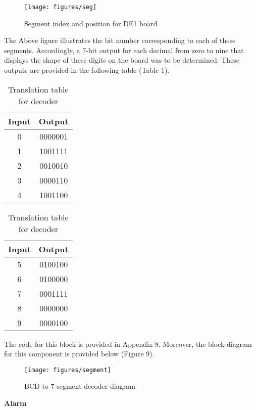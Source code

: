 \documentclass[12pt,a4paper]{article}
\begin{document}
		\vspace{-0.5cm} 
	\begin{figure}[H]
		\centering
		\texttt{[image: figures/seg]}
		\caption{Segment index and position for DE1 board}
	\end{figure}
\vspace{-0.2cm}
	\noindent The Above figure illustrates the bit number corresponding to each of these segments. Accordingly, a 7-bit output for each decimal from zero to nine that displays the shape of these digits on the board was to be determined. These outputs are provided in the following table (Table 1).
	\begin{table}[H]
		\centering
		\begin{tabular}{|c | c| }
			\hline
			\textbf{Input} & \textbf{Output} \\ \hline
			0& 0000001\\\hline
			1&1001111\\\hline
			2&0010010\\\hline
			3&0000110\\\hline
			4&1001100\\\hline
		\end{tabular}
	\hspace{0.2cm}
	\begin{tabular}{|c | c| }
		\hline
		\textbf{Input} & \textbf{Output} \\ \hline
		5&0100100\\\hline
		6&0100000\\\hline
		7&0001111\\\hline
		8&0000000\\\hline
		9&0000100\\\hline
	\end{tabular}
	\caption{Translation table for decoder}
	\end{table}

	\vspace{-0.2cm}
	\noindent The code for this block is provided in Appendix 8. Moreover, the block diagram for this component is provided below (Figure 9).
	
	\begin{figure}[H]
		\centering
		\texttt{[image: figures/segment]}
		\caption{BCD-to-7-segment decoder diagram}
	\end{figure}
		
	\vspace{-0.4cm}
	\noindent \textbf{\large Alarm}
	\vspace{0.2cm}
	
\end{document}
